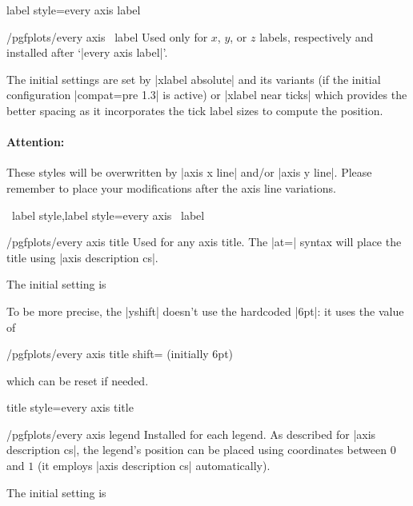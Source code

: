 \pgfplotsshortstylekey label style=every axis label\pgfeov

\begin{xystylekey}{/pgfplots/every axis \x\ label}
    Used only for $x$, $y$, or $z$ labels, respectively and installed after
    `|every axis label|'.

    The initial settings are set by |xlabel absolute| and its variants (if the
    initial configuration |compat=pre 1.3| is active) or |xlabel near ticks|
    which provides the better spacing as it incorporates the tick label sizes
    to compute the position.


    \paragraph{Attention:}

    These styles will be overwritten by |axis x line| and/or |axis y line|.
    Please remember to place your modifications after the axis line variations.
\end{xystylekey}

\pgfplotsshortxystylekeys \x\ label style,\x label style=every axis \x\ label\pgfeov

\begin{stylekey}{/pgfplots/every axis title}
    Used for any axis title. The |at=| syntax will place the title
    using |axis description cs|.

    The initial setting is
\begin{codeexample}
\end{codeexample}

    To be more precise, the |yshift| doesn't use the hardcoded |6pt|: it uses
    the value of

    \begin{key}{/pgfplots/every axis title shift= (initially 6pt)}
    \end{key}

    which can be reset if needed.
\end{stylekey}

\pgfplotsshortstylekey title style=every axis title\pgfeov

\begin{stylekey}{/pgfplots/every axis legend}
    Installed for each legend. As described for |axis description cs|, the
    legend's position can be placed using coordinates between $0$ and $1$ (it
    employs |axis description cs| automatically).

    The initial setting is
\begin{codeexample}
\end{codeexample}
\end{stylekey}

